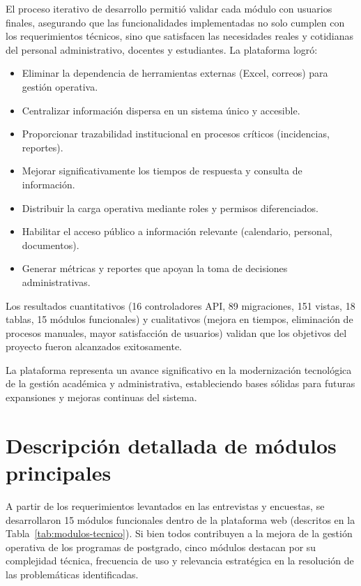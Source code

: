 El proceso iterativo de desarrollo permitió validar cada módulo con usuarios finales, asegurando que las funcionalidades implementadas no solo cumplen con los requerimientos técnicos, sino que satisfacen las necesidades reales y cotidianas del personal administrativo, docentes y estudiantes. La plataforma logró:

\begin{itemize}
    \item Eliminar la dependencia de herramientas externas (Excel, correos) para gestión operativa.
    \item Centralizar información dispersa en un sistema único y accesible.
    \item Proporcionar trazabilidad institucional en procesos críticos (incidencias, reportes).
    \item Mejorar significativamente los tiempos de respuesta y consulta de información.
    \item Distribuir la carga operativa mediante roles y permisos diferenciados.
    \item Habilitar el acceso público a información relevante (calendario, personal, documentos).
    \item Generar métricas y reportes que apoyan la toma de decisiones administrativas.
\end{itemize}

Los resultados cuantitativos (16 controladores API, 89 migraciones, 151 vistas, 18 tablas, 15 módulos funcionales) y cualitativos (mejora en tiempos, eliminación de procesos manuales, mayor satisfacción de usuarios) validan que los objetivos del proyecto fueron alcanzados exitosamente.

La plataforma representa un avance significativo en la modernización tecnológica de la gestión académica y administrativa, estableciendo bases sólidas para futuras expansiones y mejoras continuas del sistema.

\section{Descripción detallada de módulos principales}

A partir de los requerimientos levantados en las entrevistas y encuestas, se desarrollaron 15 módulos funcionales dentro de la plataforma web (descritos en la Tabla~\ref{tab:modulos-tecnico}). Si bien todos contribuyen a la mejora de la gestión operativa de los programas de postgrado, cinco módulos destacan por su complejidad técnica, frecuencia de uso y relevancia estratégica en la resolución de las problemáticas identificadas.

